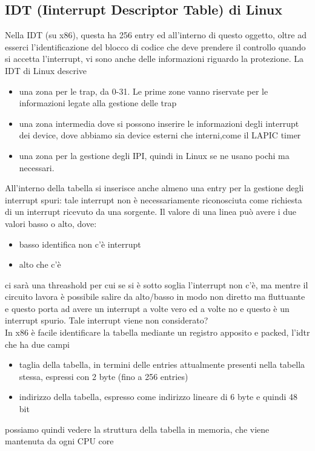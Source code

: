 \documentclass[12pt, oneside]{extbook}
\begin{document}
\subsection{IDT (Iinterrupt Descriptor Table) di Linux}
Nella IDT (su x86), questa ha 256 entry ed all'interno di questo oggetto, oltre ad esserci l'identificazione del blocco di codice che deve prendere il controllo quando si accetta l'interrupt, vi sono anche delle informazioni riguardo la protezione. La IDT di Linux descrive
\begin{itemize}
\item una zona per le trap, da 0-31. Le prime zone vanno riservate per le informazioni legate alla gestione delle trap
\item una zona intermedia dove si possono inserire le informazioni degli interrupt dei device, dove abbiamo sia device esterni che interni,come il LAPIC timer
\item una zona per la gestione degli IPI, quindi in Linux se ne usano pochi ma necessari.
\end{itemize}
All'interno della tabella si inserisce anche almeno una entry per la gestione degli interrupt spuri: tale interrupt non è necessariamente riconosciuta come richiesta di un interrupt ricevuto da una sorgente. Il valore di una linea può avere i due valori basso o alto, dove:
\begin{itemize}
\item basso identifica non c'è interrupt
\item alto che c'è
\end{itemize}
ci sarà una threashold per cui se si è sotto soglia l'interrupt non c'è, ma mentre il circuito lavora è possibile salire da alto/basso in modo non diretto ma fluttuante e questo porta ad avere un interrupt a volte vero ed a volte no e questo è un interrupt spurio. Tale interrupt viene non considerato?\\In x86 è facile identificare la tabella mediante un registro apposito e packed, l'idtr che ha due campi
\begin{itemize}
\item taglia della tabella, in termini delle entries attualmente presenti nella tabella stessa, espressi con 2 byte (fino a 256 entries)
\item indirizzo della tabella, espresso come indirizzo lineare di 6 byte e quindi 48 bit
\end{itemize}
possiamo quindi vedere la struttura della tabella in memoria, che viene mantenuta da ogni CPU core
\end{document}
